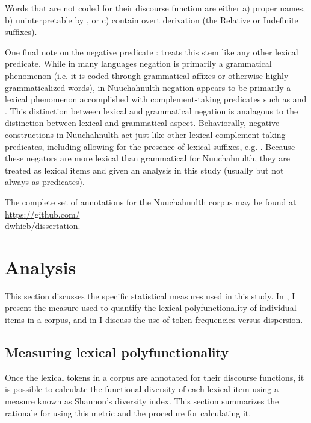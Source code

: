 Words that are not coded for their discourse function are either a) proper names, b) uninterpretable by \textcite{Nakayama2001}, or c) contain overt derivation (the Relative or Indefinite suffixes).

One final note on the negative predicate : \textcite[119--122]{Nakayama2001} treats this stem like any other lexical predicate. While in many languages negation is primarily a grammatical phenomenon (i.e. it is coded through grammatical affixes or otherwise highly-grammaticalized words), in Nuuchahnulth negation appears to be primarily a lexical phenomenon accomplished with complement-taking predicates such as   and  . This distinction between lexical and grammatical negation is analagous to the distinction between lexical and grammatical aspect. Behaviorally, negative constructions in Nuuchahnulth act just like other lexical complement-taking predicates, including allowing for the presence of lexical suffixes, e.g.  . Because these negators are more lexical than grammatical for Nuuchahnulth, they are treated as lexical items and given an analysis in this study (usually but not always as predicates).

The complete set of annotations for the Nuuchahnulth corpus may be found at \href{https://github.com/dwhieb/dissertation}{https://github.com/\\dwhieb/dissertation}.

\section{Analysis}
\label{sec:3.4}

This section discusses the specific statistical measures used in this study. In , I present the measure used to quantify the lexical polyfunctionality of individual items in a corpus, and in  I discuss the use of token frequencies versus dispersion.

\subsection{Measuring lexical polyfunctionality}
\label{sec:3.4.1}

Once the lexical tokens in a corpus are annotated for their discourse functions, it is possible to calculate the functional diversity of each lexical item using a measure known as Shannon's diversity index. This section summarizes the rationale for using this metric and the procedure for calculating it.

